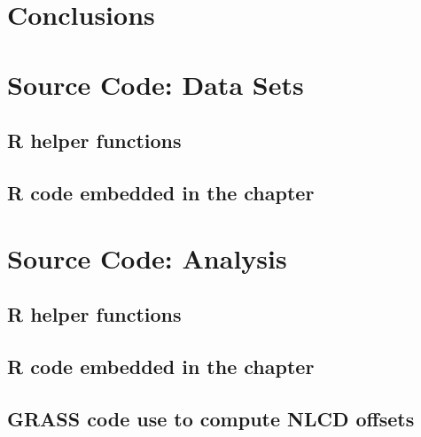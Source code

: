 \documentclass[draftthesis]{neiuthesis}
\begin{document}
\mainmatter

\todototoc
\listoftodos





\chapter{Conclusions}
\label{cha:conclusions}



\backmatter



\appendix

\chapter{Source Code: Data Sets}

\section*{R helper functions}


\section*{R code embedded in the chapter}



\chapter{Source Code: Analysis}

\section*{R helper functions}


\section*{R code embedded in the chapter}


\section*{GRASS code use to compute NLCD offsets}

\end{document}
